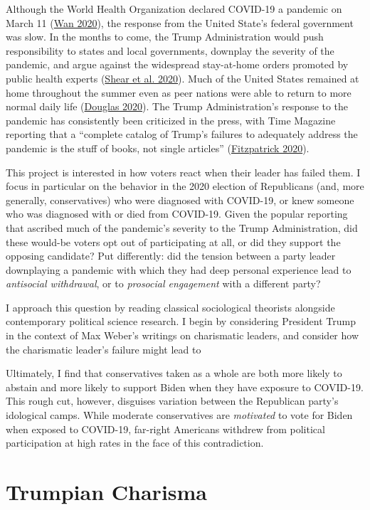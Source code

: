 \documentclass[
  12pt,
]{article}
\begin{document}
Although the World Health Organization declared COVID-19 a pandemic on March 11 (\protect\hyperlink{ref-Wan2020}{Wan 2020}), the response from the United State's federal government was slow. In the months to come, the Trump Administration would push responsibility to states and local governments, downplay the severity of the pandemic, and argue against the widespread stay-at-home orders promoted by public health experts (\protect\hyperlink{ref-Shear2020}{Shear et al. 2020}). Much of the United States remained at home throughout the summer even as peer nations were able to return to more normal daily life (\protect\hyperlink{ref-Douglas2020}{Douglas 2020}). The Trump Administration's response to the pandemic has consistently been criticized in the press, with Time Magazine reporting that a ``complete catalog of Trump's failures to adequately address the pandemic is the stuff of books, not single articles'' (\protect\hyperlink{ref-Fitzpatrick2020}{Fitzpatrick 2020}).

This project is interested in how voters react when their leader has failed them. I focus in particular on the behavior in the 2020 election of Republicans (and, more generally, conservatives) who were diagnosed with COVID-19, or knew someone who was diagnosed with or died from COVID-19. Given the popular reporting that ascribed much of the pandemic's severity to the Trump Administration, did these would-be voters opt out of participating at all, or did they support the opposing candidate? Put differently: did the tension between a party leader downplaying a pandemic with which they had deep personal experience lead to \emph{antisocial withdrawal}, or to \emph{prosocial engagement} with a different party?

I approach this question by reading classical sociological theorists alongside contemporary political science research. I begin by considering President Trump in the context of Max Weber's writings on charismatic leaders, and consider how the charismatic leader's failure might lead to

Ultimately, I find that conservatives taken as a whole are both more likely to abstain and more likely to support Biden when they have exposure to COVID-19. This rough cut, however, disguises variation between the Republican party's idological camps. While moderate conservatives are \emph{motivated} to vote for Biden when exposed to COVID-19, far-right Americans withdrew from political participation at high rates in the face of this contradiction.

\hypertarget{trumpian-charisma}{%
\section*{Trumpian Charisma}\label{trumpian-charisma}}
\end{document}

